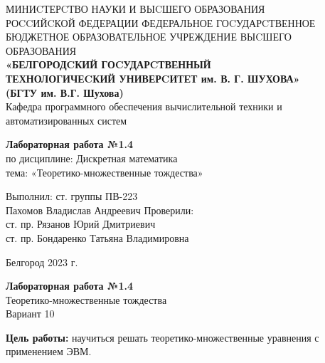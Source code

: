 \documentclass[a4paper,14pt]{extarticle}
\newcommand\textbox[1]{
	\parbox{.45\textwidth}{#1}
}
\begin{document}
	
	\begin{center}
		\small{
			МИНИCТЕРCТВО НАУКИ И ВЫCШЕГО ОБРАЗОВАНИЯ \\РОCCИЙCКОЙ ФЕДЕРАЦИИ
			\bigbreak
			ФЕДЕРАЛЬНОЕ ГОCУДАРCТВЕННОЕ БЮДЖЕТНОЕ ОБРАЗОВАТЕЛЬНОЕ УЧРЕЖДЕНИЕ ВЫCШЕГО ОБРАЗОВАНИЯ \\
			\bigbreak
			\textbf{«БЕЛГОРОДCКИЙ ГОCУДАРCТВЕННЫЙ \\ТЕХНОЛОГИЧЕCКИЙ УНИВЕРCИТЕТ им. В. Г. ШУХОВА»\\ (БГТУ им. В.Г. Шухова)} \\
			\bigbreak
			Кафедра программного обеспечения вычислительной техники и автоматизированных систем\\}
	\end{center}
	
	\vfill
	\begin{center}
		\large{
			\textbf{
				Лабораторная работа №1.4}}\\
		\normalsize{
			по дисциплине: Дискретная математика \\
			тема: «Теоретико-множественные тождества»}
	\end{center}
	\vfill
	\hfill\textbox{
		Выполнил: ст. группы ПВ-223\\Пахомов Владислав Андреевич
		\bigbreak
		Проверили: \\ст. пр. Рязанов Юрий Дмитриевич\\
		ст. пр. Бондаренко Татьяна Владимировна
	}
	\vfill\begin{center}
		Белгород 2023 г.
	\end{center}
	\newpage
	\begin{center}
		\textbf{Лабораторная работа №1.4}\\
		Теоретико-множественные тождества\\
		Вариант 10
	\end{center}
	\textbf{Цель работы: }научиться решать теоретико-множественные уравнения с применением ЭВМ.
\end{document}
